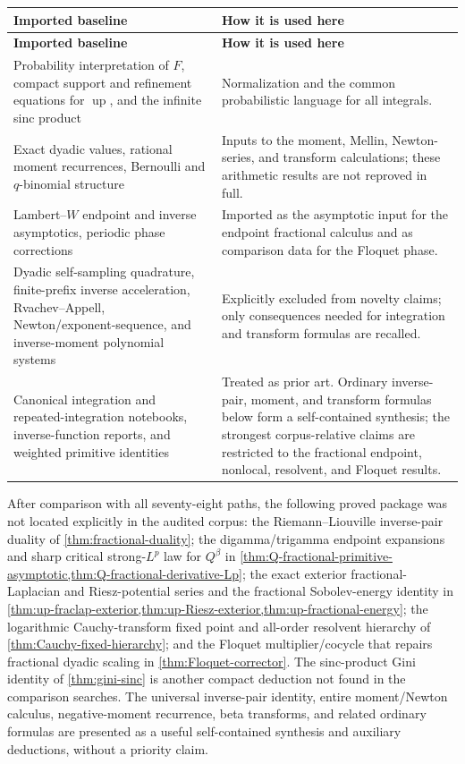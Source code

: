 \documentclass[11pt,oneside]{article}
\theoremstyle{definition}
\newcommand{\F}{F}
\newcommand{\Q}{Q}
\newcommand{\upf}{\operatorname{up}}
\begin{document}
\begin{longtable}{@{}p{}p{}@{}}
\toprule
\textbf{Imported baseline} & \textbf{How it is used here}\\
\midrule
\endfirsthead
\toprule
\textbf{Imported baseline} & \textbf{How it is used here}\\
\midrule
\endhead
Probability interpretation of \(\F\), compact support and refinement equations for
\(\upf\), and the infinite sinc product & Normalization and the common probabilistic
language for all integrals.\\
Exact dyadic values, rational moment recurrences, Bernoulli and \(q\)-binomial structure &
Inputs to the moment, Mellin, Newton-series, and transform calculations; these arithmetic
results are not reproved in full.\\
Lambert--\(W\) endpoint and inverse asymptotics, periodic phase corrections & Imported as
the asymptotic input for the endpoint fractional calculus and as comparison data for the
Floquet phase.\\
Dyadic self-sampling quadrature, finite-prefix inverse acceleration, Rvachev--Appell,
Newton/exponent-sequence, and inverse-moment polynomial systems & Explicitly excluded from
novelty claims; only consequences needed for integration and transform formulas are
recalled.\\
Canonical integration and repeated-integration notebooks, inverse-function reports, and
weighted primitive identities & Treated as prior art.  Ordinary inverse-pair, moment, and
transform formulas below form a self-contained synthesis; the strongest corpus-relative
claims are restricted to the fractional endpoint, nonlocal, resolvent, and Floquet results.\\
\bottomrule
\end{longtable}

\begin{resultbox}
After comparison with all seventy-eight paths, the following proved package was not located
explicitly in the audited corpus: the Riemann--Liouville inverse-pair duality of
\cref{thm:fractional-duality}; the digamma/trigamma endpoint expansions and sharp critical
strong-\(L^p\) law for \(\Q^\beta\) in
\cref{thm:Q-fractional-primitive-asymptotic,thm:Q-fractional-derivative-Lp}; the exact
exterior fractional-Laplacian and Riesz-potential series and the fractional Sobolev-energy
identity in \cref{thm:up-fraclap-exterior,thm:up-Riesz-exterior,thm:up-fractional-energy};
the logarithmic Cauchy-transform fixed point and all-order resolvent hierarchy of
\cref{thm:Cauchy-fixed-hierarchy}; and the Floquet multiplier/cocycle that repairs
fractional dyadic scaling in \cref{thm:Floquet-corrector}.  The sinc-product Gini identity
of \cref{thm:gini-sinc} is another compact deduction not found in the comparison searches.
The universal inverse-pair identity, entire moment/Newton calculus, negative-moment
recurrence, beta transforms, and related ordinary formulas are presented as a useful
self-contained synthesis and auxiliary deductions, without a priority claim.
\end{resultbox}
\end{document}
